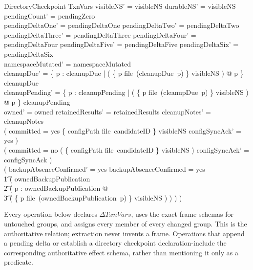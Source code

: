 \documentclass{article}
\begin{document}
\begin{schema}{DirectoryCheckpoint}
	\Delta TxnVars
	\where
	visibleNS' = visibleNS \land durableNS' = visibleNS \land
	pendingCount' = pendingZero \\
	pendingDeltaOne' = pendingDeltaOne \land pendingDeltaTwo' = pendingDeltaTwo \land
	pendingDeltaThree' = pendingDeltaThree \land
	pendingDeltaFour' = pendingDeltaFour \land
	pendingDeltaFive' = pendingDeltaFive \land pendingDeltaSix' = pendingDeltaSix \\
	namespaceMutated' = namespaceMutated \\
	cleanupDue' = \{ p : \dom cleanupDue |
	\lnot ( \{ p \mapsto file~(cleanupDue~p) \} \subseteq visibleNS ) @ p \}
	\ndres cleanupDue \\
	cleanupPending' = \{ p : \dom cleanupPending |
	\lnot ( \{ p \mapsto file~(cleanupDue~p) \} \subseteq visibleNS ) @ p \}
	\ndres cleanupPending \\
	owned' = owned \land retainedResults' = retainedResults \land
	cleanupNotes' = cleanupNotes \\
	( committed = yes \land
	\{ configPath \mapsto file~candidateID \} \subseteq visibleNS
	\implies configSyncAck' = yes ) \\
	( committed = no \lor
	\lnot ( \{ configPath \mapsto file~candidateID \} \subseteq visibleNS )
	\implies configSyncAck' = configSyncAck ) \\
	( backupAbsenceConfirmed' = yes \iff backupAbsenceConfirmed = yes \lor \\
	\t1 ( ownedBackupPublication \neq \emptyset \land \\
	\t2 ( \forall p : \dom ownedBackupPublication @ \\
	\t3 \lnot ( \{ p \mapsto file~(ownedBackupPublication~p) \}
	\subseteq visibleNS ) ) ) )
\end{schema}

Every operation below declares $\Delta TxnVars$, uses the exact frame schemas
for untouched groups, and assigns every member of every changed group.  This is
the authoritative relation; extraction never invents a frame.  Operations that
append a pending delta or establish a directory checkpoint declaration-include
the corresponding authoritative effect schema, rather than mentioning it only
as a predicate.
\end{document}
